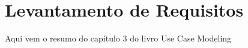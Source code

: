 \chapter{Levantamento de Requisitos}

Aqui vem o resumo do capítulo 3 do livro Use Case Modeling

\begin{citacaoLonga}
  \blindtext
\end{citacaoLonga}

\blindtext
